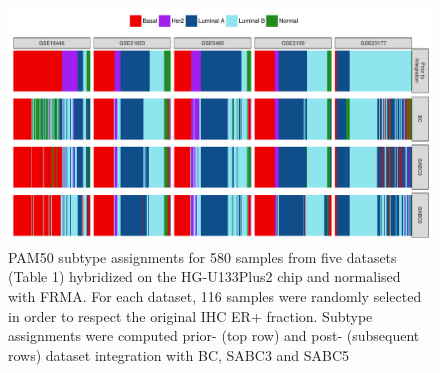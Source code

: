 \documentclass{article}\usepackage[]{graphicx}\usepackage[]{color}
\makeatletter
\def\maxwidth{ %
  \ifdim\Gin@nat@width>\linewidth
    \linewidth
  \else
    \Gin@nat@width
  \fi
}
\newenvironment{knitrout}{}{} %
\makeatother
\begin{document}
\begin{knitrout}
\color{fgcolor}\begin{figure}

{\centering \includegraphics[width=\maxwidth]{figure/pam50-concordance-proportions-plot-1} 

}

\caption[PAM50 subtype assignments for 580 samples from five datasets (Table 1) hybridized on the HG-U133Plus2 chip and normalised with FRMA]{PAM50 subtype assignments for 580 samples from five datasets (Table 1) hybridized on the HG-U133Plus2 chip and normalised with FRMA.  For each dataset, 116 samples were randomly selected in order to respect the original IHC ER+ fraction.  Subtype assignments were computed prior- (top row) and post- (subsequent rows) dataset integration with BC, SABC3 and SABC5}\label{fig:pam50-concordance-proportions-plot}
\end{figure}


\end{knitrout}
\end{document}
